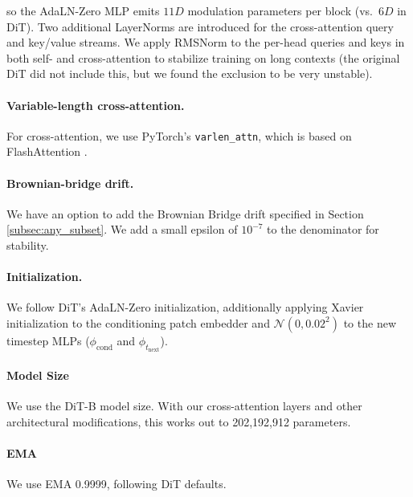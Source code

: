 so the AdaLN-Zero MLP emits $11D$ modulation parameters per block (vs.\ $6D$ in DiT). Two additional LayerNorms are introduced for the cross-attention query and key/value streams. We apply RMSNorm \cite{zhang2019root} to the per-head queries and keys in both self- and cross-attention to stabilize training on long contexts (the original DiT did not include this, but we found the exclusion to be very unstable).

\paragraph{Variable-length cross-attention.} For cross-attention, we use PyTorch's \texttt{varlen\_attn}, which is based on FlashAttention \cite{dao2022flashattention, dao2023flashattention}. %

\paragraph{Brownian-bridge drift.}
We have an option to add the Brownian Bridge drift specified in Section \ref{subsec:any_subset}. We add a small epsilon of $10^{-7}$ to the denominator for stability.

\paragraph{Initialization.} We follow DiT's AdaLN-Zero initialization, additionally applying Xavier initialization \cite{glorot2010understanding} to the conditioning patch embedder and $\mathcal{N}(0, 0.02^2)$ to the new timestep MLPs ($\phi_{\text{cond}}$ and $\phi_{t_{\text{next}}}$).

\paragraph{Model Size}
We use the DiT-B model size. With our cross-attention layers and other architectural modifications, this works out to 202,192,912 parameters.

\paragraph{EMA} We use EMA 0.9999, following DiT defaults.
